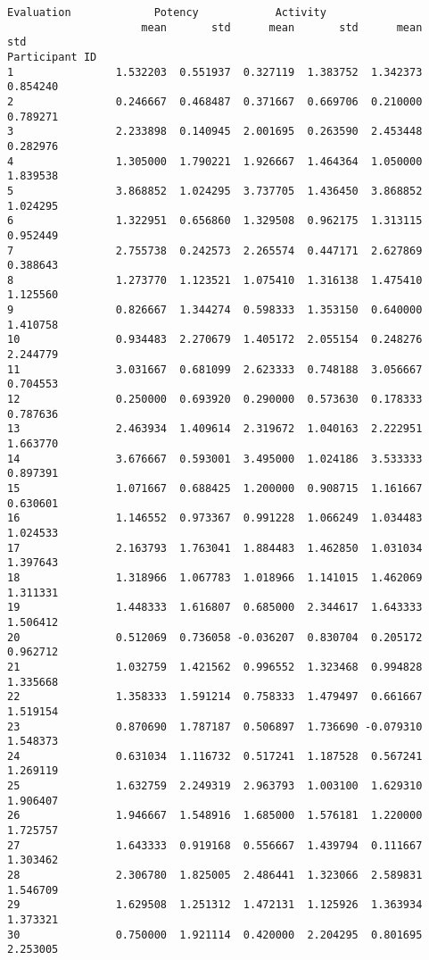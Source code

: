\documentclass[11pt]{article}
\begin{document}
    \begin{Verbatim}[commandchars=\\\{\}]
               Evaluation             Potency            Activity          
                     mean       std      mean       std      mean       std
Participant ID                                                             
1                1.532203  0.551937  0.327119  1.383752  1.342373  0.854240
2                0.246667  0.468487  0.371667  0.669706  0.210000  0.789271
3                2.233898  0.140945  2.001695  0.263590  2.453448  0.282976
4                1.305000  1.790221  1.926667  1.464364  1.050000  1.839538
5                3.868852  1.024295  3.737705  1.436450  3.868852  1.024295
6                1.322951  0.656860  1.329508  0.962175  1.313115  0.952449
7                2.755738  0.242573  2.265574  0.447171  2.627869  0.388643
8                1.273770  1.123521  1.075410  1.316138  1.475410  1.125560
9                0.826667  1.344274  0.598333  1.353150  0.640000  1.410758
10               0.934483  2.270679  1.405172  2.055154  0.248276  2.244779
11               3.031667  0.681099  2.623333  0.748188  3.056667  0.704553
12               0.250000  0.693920  0.290000  0.573630  0.178333  0.787636
13               2.463934  1.409614  2.319672  1.040163  2.222951  1.663770
14               3.676667  0.593001  3.495000  1.024186  3.533333  0.897391
15               1.071667  0.688425  1.200000  0.908715  1.161667  0.630601
16               1.146552  0.973367  0.991228  1.066249  1.034483  1.024533
17               2.163793  1.763041  1.884483  1.462850  1.031034  1.397643
18               1.318966  1.067783  1.018966  1.141015  1.462069  1.311331
19               1.448333  1.616807  0.685000  2.344617  1.643333  1.506412
20               0.512069  0.736058 -0.036207  0.830704  0.205172  0.962712
21               1.032759  1.421562  0.996552  1.323468  0.994828  1.335668
22               1.358333  1.591214  0.758333  1.479497  0.661667  1.519154
23               0.870690  1.787187  0.506897  1.736690 -0.079310  1.548373
24               0.631034  1.116732  0.517241  1.187528  0.567241  1.269119
25               1.632759  2.249319  2.963793  1.003100  1.629310  1.906407
26               1.946667  1.548916  1.685000  1.576181  1.220000  1.725757
27               1.643333  0.919168  0.556667  1.439794  0.111667  1.303462
28               2.306780  1.825005  2.486441  1.323066  2.589831  1.546709
29               1.629508  1.251312  1.472131  1.125926  1.363934  1.373321
30               0.750000  1.921114  0.420000  2.204295  0.801695  2.253005

\end{Verbatim}
\end{document}
